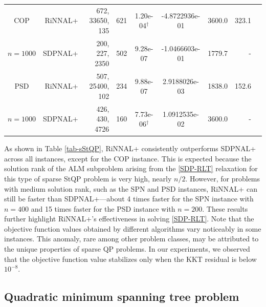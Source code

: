 \documentclass[11pt]{article}
\theoremstyle{plain}
\begin{document}
\begin{footnotesize}
\begin{longtable}[c]{crrrccrrr}
COP& RiNNAL+ & 672, 33650, 135 & 621 & 1.20e-04$^{\dagger}$ & -4.8722936e-01 & 3600.0 &323.1 \\ 
$n=1000$ & SDPNAL+ & 200, 227, 2350 & 502& 9.28e-07 & -1.0466603e-01 & 1779.7 & - \\ [3pt] 

PSD& RiNNAL+ & 507, 25400, 102 & 234 & 9.88e-07 & 2.9188026e-03 & 1838.0 &152.6 \\ 
$n=1000$ & SDPNAL+ & 426, 430, 4726 & 160& 7.73e-06$^{\dagger}$ & 1.0912535e-02 & 3600.0 & - \\ [3pt] 

\end{longtable}
\end{footnotesize}

As shown in Table \ref{tab-sStQP},
RiNNAL+ consistently outperforms SDPNAL+ across all instances, except for the COP instance. This is expected because the solution rank of the ALM subproblem arising from the \eqref{SDP-RLT} relaxation for this type of sparse StQP problem is very high, nearly $n/2$. However, for problems with medium solution rank, such as the SPN and PSD instances, RiNNAL+ can still be faster than SDPNAL+—about 4 times faster for the SPN instance with $n=400$ and 15 times faster for the PSD instance with $n=200$. These results further highlight RiNNAL+'s effectiveness in solving \eqref{SDP-RLT}. Note that the objective function values obtained by different algorithms vary noticeably in some instances. This anomaly, rare among other problem classes, may be attributed to the unique properties of sparse QP problems. In our experiments, we observed that the objective function value stabilizes only when the KKT residual is below $10^{-8}$.


\subsection{Quadratic minimum spanning tree problem}\label{subsec-QMSTP}
\end{document}
